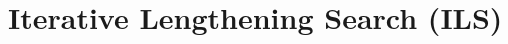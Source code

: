 \section{Iterative Lengthening Search (ILS) \cite{ai/book/Artificial-Intelligence-A-Modern-Approach/Russell-Norvig}}
















